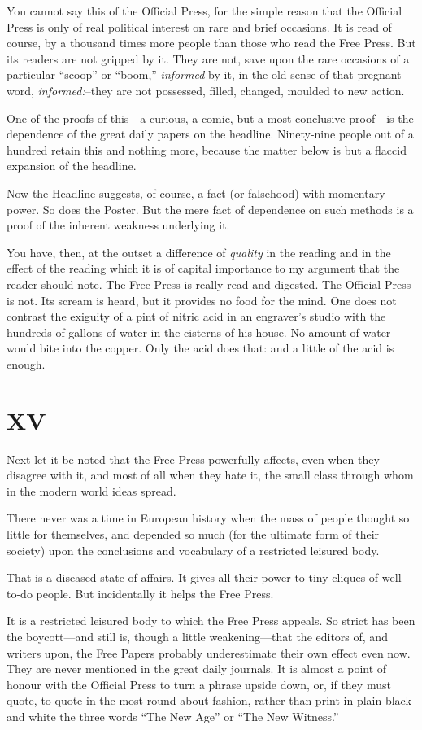 \documentclass{book}
\begin{document}
You cannot say this of the Official Press, for the simple reason that the Official Press is only of real political interest on rare and brief occasions. It is read of course, by a thousand times more people than those who read the Free Press. But its readers are not gripped by it. They are not, save upon the rare occasions of a particular “scoop” or “boom,” \emph{informed} by it, in the old sense of that pregnant word, \emph{informed:}–they are not possessed, filled, changed, moulded to new action.

One of the proofs of this—a curious, a comic, but a most conclusive proof—is the dependence of the great daily papers on the headline. Ninety-nine people out of a hundred retain this and nothing more, because the matter below is but a flaccid expansion of the headline.

Now the Headline suggests, of course, a fact (or falsehood) with momentary power. So does the Poster. But the mere fact of dependence on such methods is a proof of the inherent weakness underlying it.

You have, then, at the outset a difference of \emph{quality} in the reading and in the effect of the reading which it is of capital importance to my argument that the reader should note. The Free Press is really read and digested. The Official Press is not. Its scream is heard, but it provides no food for the mind. One does not contrast the exiguity of a pint of nitric acid in an engraver’s studio with the hundreds of gallons of water in the cisterns of his house. No amount of water would bite into the copper. Only the acid does that: and a little of the acid is enough.

\chapter*{XV}
\label{chapter-16}
Next let it be noted that the Free Press powerfully affects, even when they disagree with it, and most of all when they hate it, the small class through whom in the modern world ideas spread.

There never was a time in European history when the mass of people thought so little for themselves, and depended so much (for the ultimate form of their society) upon the conclusions and vocabulary of a restricted leisured body.

That is a diseased state of affairs. It gives all their power to tiny cliques of well-to-do people. But incidentally it helps the Free Press.

It is a restricted leisured body to which the Free Press appeals. So strict has been the boycott—and still is, though a little weakening—that the editors of, and writers upon, the Free Papers probably underestimate their own effect even now. They are never mentioned in the great daily journals. It is almost a point of honour with the Official Press to turn a phrase upside down, or, if they must quote, to quote in the most round-about fashion, rather than print in plain black and white the three words “The New Age” or “The New Witness.”
\end{document}
